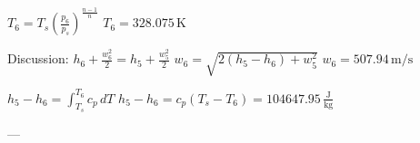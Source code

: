 \( T_6 = T_s \left( \frac{p_6}{p_s} \right)^{\frac{n-1}{n}} \)  
\( T_6 = 328.075 \, \text{K} \)  

Discussion:  
\( h_6 + \frac{w_6^2}{2} = h_5 + \frac{w_5^2}{2} \)  
\( w_6 = \sqrt{2(h_5 - h_6) + w_5^2} \)  
\( w_6 = 507.94 \, \text{m/s} \)  

\( h_5 - h_6 = \int_{T_s}^{T_6} c_p \, dT \)  
\( h_5 - h_6 = c_p (T_s - T_6) = 104647.95 \, \frac{\text{J}}{\text{kg}} \)  

---